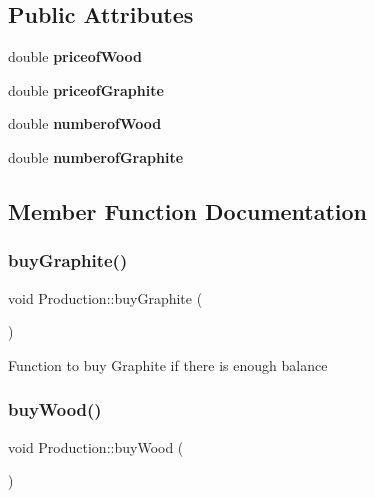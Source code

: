\subsection*{Public Attributes}
\begin{DoxyCompactItemize}
\item 
\mbox{\label{classProduction_ac6bc16863f128802bebbb52263d5558c}} 
double {\bfseries priceof\+Wood}
\item 
\mbox{\label{classProduction_afca6aca1df88921b60bb7190adab5d51}} 
double {\bfseries priceof\+Graphite}
\item 
\mbox{\label{classProduction_a5d77a106ee08bfb55522cdd28e0d364e}} 
double {\bfseries numberof\+Wood}
\item 
\mbox{\label{classProduction_a3b0d11cefec32eeec83637e1d5252a41}} 
double {\bfseries numberof\+Graphite}
\end{DoxyCompactItemize}


\subsection{Member Function Documentation}
\mbox{\label{classProduction_adf62fb3241254aa3412ed9a9d1fb27a2}} 
\subsubsection{\texorpdfstring{buy\+Graphite()}{buyGraphite()}}
{\footnotesize\ttfamily void Production\+::buy\+Graphite (\begin{DoxyParamCaption}{ }\end{DoxyParamCaption})}

Function to buy Graphite if there is enough balance \mbox{\label{classProduction_a5eea7af1f4949832bcc0c019f420d655}} 
\subsubsection{\texorpdfstring{buy\+Wood()}{buyWood()}}
{\footnotesize\ttfamily void Production\+::buy\+Wood (\begin{DoxyParamCaption}{ }\end{DoxyParamCaption})}

